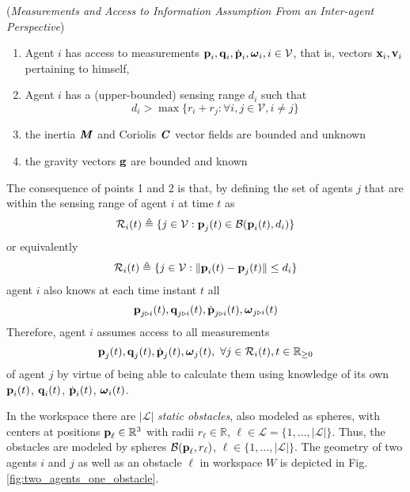 \begin{gg_box}
  \begin{assumption} (\textit{Measurements and Access to Information Assumption From an
    Inter-agent Perspective})
  \begin{enumerate}

    \item Agent $i$ has access to measurements
      $\bm{\mathbf{p}}_i, \bm{\mathbf{q}}_i, \dot{\bm{\mathbf{p}}}_i, \bm{\mathbf{\omega}}_i, i\in\mathcal{V}$,
      that is, vectors $\bm{\mathbf{x}}_i, \bm{\mathbf{v}}_i$ pertaining to himself,

    \item Agent $i$ has a (upper-bounded) sensing range $d_i$ such that
      $$d_i > \max\{r_i + r_j : \forall i,j \in \mathcal{V}, i \neq j\}$$

    \item the inertia $\bm{\mathit{M}}$ and Coriolis $\bm{\mathit{C}}$ vector fields are
      bounded and unknown

    \item the gravity vectors $\bm{\mathbf{g}}$ are bounded and known

  \end{enumerate}
  \label{ass:measurements_access}
\end{assumption}
\end{gg_box}

The consequence of points 1 and 2 is that, by defining the set of
agents $j$ that are within the sensing range of agent $i$ at time $t$ as
$$\mathcal{R}_i(t) \triangleq \{j\in\mathcal{V} : \bm{\mathbf{p}}_j(t)\in\mathcal{B}(\bm{\mathbf{p}}_i(t), d_i)\}$$
or equivalently
$$\mathcal{R}_i(t) \triangleq \{j\in\mathcal{V} : \| \bm{\mathbf{p}}_i(t) - \bm{\mathbf{p}}_j(t) \| \leq d_i\}$$
agent $i$ also knows at each time instant $t$ all
$$\bm{\mathbf{p}}_{j \triangleright i}(t), \bm{\mathbf{q}}_{j \triangleright i}(t),
\dot{\bm{\mathbf{p}}}_{j \triangleright i}(t), \bm{\mathbf{\omega}}_{j \triangleright i}(t)$$
Therefore, agent $i$ assumes access to all measurements
$$\bm{\mathbf{p}}_{j}(t), \bm{\mathbf{q}}_{j}(t), \dot{\bm{\mathbf{p}}}_j(t),
\bm{\mathbf{\omega}}_j(t),\ \forall j\in \mathcal{R}_i(t),t\in\mathbb{R}_{\geq 0}$$
of agent $j$ by virtue of being able to calculate them using knowledge of its own
$\bm{\mathbf{p}}_i(t)$, $\bm{\mathbf{q}}_i(t)$, $\dot{\bm{\mathbf{p}}}_i(t)$, $\bm{\mathbf{\omega}}_i(t)$.


In the workspace there are $|\mathcal{L}|$ \textit{static obstacles},
also modeled as spheres, with centers at positions
$\bm{\mathbf{p}}_{\ell} \in \mathbb{R}^3$ with radii
$r_{\ell}\in \mathbb{R}$, $\ell \in \mathcal{L} = \{1,\dots,|\mathcal{L}| \}$.
Thus, the obstacles are modeled by spheres
$\mathcal{B}(\bm{\mathbf{p}}_{\ell}, r_{\ell})$, $\ell \in \{1,\dots,|\mathcal{L}|\}$.
The geometry of two agents $i$ and $j$ as well as an obstacle
$\ell$ in workspace $W$ is depicted in Fig. \ref{fig:two_agents_one_obstacle}.\\

